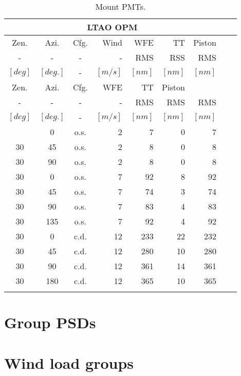 \documentclass{gmto-book}
\begin{document}
\begin{longtable}{cccr||rrrrr}
  \caption{Mount PMTs.} \label{tab:long} \\\hline\hline
  \multicolumn{7}{|c}{\textbf{LTAO OPM}}
  \\\hline\hline
  Zen. & Azi. & Cfg. & Wind  & WFE & TT & Piston \\
  - & -    & -    &  -   &  RMS & RSS  & RMS  \\
  $[deg]$  & $[deg.]$ & - & $[m/s]$ & $[nm]$& $[nm]$&
  $[nm]$ \\\hline\hline
  \endfirsthead

  Zen. & Azi. & Cfg.  & WFE & TT & Piston \\
  - & -    & -    &  -   &  RMS & RMS  & RMS  \\
  $[deg]$  & $[deg.]$ & - & $[m/s]$ & $[nm]$& $[nm]$&
  $[nm]$ \\\hline\hline
  
  \endhead

  \endfoot
  \hline \hline
  \endlastfoot
  30 & 0 & o.s. & 2    &   7 &  0 &   7 \\\hline  
  30 & 45 & o.s. & 2   &   8 &  0 &   8 \\\hline  
  30 & 90 & o.s. & 2   &   8 &  0 &   8 \\\hline\hline  
  30 & 0 & o.s. & 7    &  92 &  8 &  92  \\\hline  
  30 & 45 & o.s. & 7   &  74 &  3 &  74 \\\hline  
  30 & 90 & o.s. & 7   &  83 &  4 &  83 \\\hline  
  30 & 135 & o.s. & 7  &  92 &  4 &  92 \\\hline\hline  
  30 & 0 & c.d. & 12   & 233 & 22 & 232  \\\hline  
  30 & 45 & c.d. & 12  & 280 & 10 & 280  \\\hline  
  30 & 90 & c.d. & 12  & 361 & 14 & 361  \\\hline  
  30 & 180 & c.d. & 12 & 365 & 10 & 365  \\  
  
  \label{mount-pmts}
\end{longtable}





\appendix

%

\chapter{Group PSDs}


\chapter{Wind load groups}



\printbibliography
\end{document}
